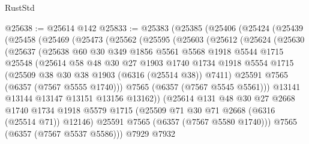 \begin{lexlean}{RustStd}
\begin{coremodule}
@25638 := @25614 @142
@25833 := @25383
    (@25385
      (@25406
        (@25424
          (@25439
            (@25458
              (@25469
                (@25473
                  (@25562
                    (@25595
                      (@25603
                        (@25612
                          (@25624
                            (@25630
                              (@25637
                                (@25638
                                  @60
                                  @30
                                  @349
                                  @1856
                                  @5561
                                  @5568
                                  @1918
                                  @5544
                                  @1715
                                  @25548
                                  (@25614
                                    @58
                                    @48
                                    @30
                                    @27
                                    @1903
                                    @1740
                                    @1734
                                    @1918
                                    @5554
                                    @1715
                                    (@25509 @38 @30 @38 @1903 (@6316 (@25514 @38)) @7411)
                                    @25591
                                    @7565
                                    (@6357 (@7567 @5555 @1740)))
                                  @7565
                                  (@6357 (@7567 @5545 @5561)))
                                @13141
                                @13144
                                @13147
                                @13151
                                @13156
                                @13162))
                            (@25614
                              @131
                              @48
                              @30
                              @27
                              @2668
                              @1740
                              @1734
                              @1918
                              @5579
                              @1715
                              (@25509 @71 @30 @71 @2668 (@6316 (@25514 @71)) @12146)
                              @25591
                              @7565
                              (@6357 (@7567 @5580 @1740)))
                            @7565
                            (@6357 (@7567 @5537 @5586)))
                          @7929
                          @7932

\end{coremodule}
\end{lexlean}

